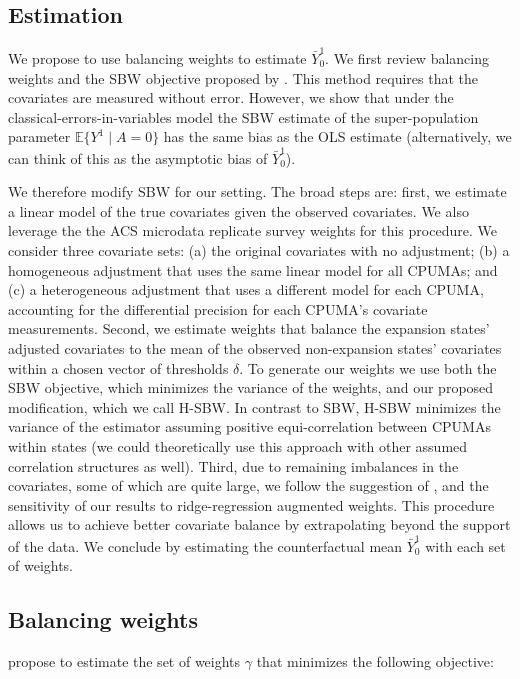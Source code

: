 \documentclass[aoas]{imsart}
\theoremstyle{plain}
\theoremstyle{remark}
\begin{document}
\subsection{Estimation}

We propose to use balancing weights to estimate $\bar{Y}_0^1$. We first review balancing weights and the SBW objective proposed by \cite{zubizarreta2015stable}. This method requires that the covariates are measured without error. However, we show that under the classical-errors-in-variables model the SBW estimate of the super-population parameter $\mathbb{E}\{Y^1 \mid A = 0\}$ has the same bias as the OLS estimate (alternatively, we can think of this as the asymptotic bias of $\bar{Y}_0^1$). 

We therefore modify SBW for our setting. The broad steps are: first, we estimate a linear model of the true covariates given the observed covariates. We also leverage the the ACS microdata replicate survey weights for this procedure. We consider three covariate sets: (a) the original covariates with no adjustment; (b) a homogeneous adjustment that uses the same linear model for all CPUMAs; and (c) a heterogeneous adjustment that uses a different model for each CPUMA, accounting for the differential precision for each CPUMA's covariate measurements. Second, we estimate weights that balance the expansion states' adjusted covariates to the mean of the observed non-expansion states' covariates within a chosen vector of thresholds $\delta$. To generate our weights we use both the SBW objective, which minimizes the variance of the weights, and our proposed modification, which we call H-SBW. In contrast to SBW, H-SBW minimizes the variance of the estimator assuming positive equi-correlation between CPUMAs within states (we could theoretically use this approach with other assumed correlation structures as well). Third, due to remaining imbalances in the covariates, some of which are quite large, we follow the suggestion of \cite{ben2018augmented}, and the sensitivity of our results to ridge-regression augmented weights. This procedure allows us to achieve better covariate balance by extrapolating beyond the support of the data. We conclude by estimating the counterfactual mean $\bar{Y}^1_0$ with each set of weights.

\subsection{Balancing weights}

\cite{zubizarreta2015stable} propose to estimate the set of weights $\gamma$ that minimizes the following objective:
\end{document}
